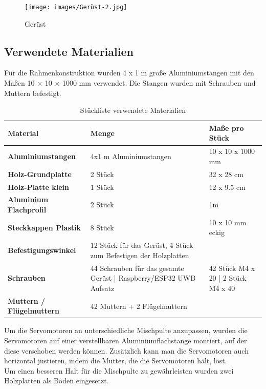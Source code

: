 \begin{figure}[H]
	\centering
	\texttt{[image: images/Gerüst-2.jpg]}
	\caption[Gerüst]{Gerüst}
	\label{fig:Gerüst-1}
\end{figure}


\newpage
\subsection{Verwendete Materialien}
Für die Rahmenkonstruktion wurden 4 x 1 m große Aluminiumstangen mit den Maßen 10 × 10 × 1000 mm verwendet. Die Stangen wurden mit Schrauben und Muttern befestigt.\\

\begin{table} [H]
	\begin{tabular}{ |p{3.3cm} |p{4.8cm}|p{4.8cm}| }
		\hline
		\textbf{Material} & \textbf{Menge}& \textbf{Maße pro Stück}\\
		\hline
		\textbf{Aluminiumstangen} & 4x1 m Aluminiumstangen & 10 x 10 x 1000 mm  \\ 
		\hline
		\textbf{Holz-Grundplatte} & 2 Stück & 32 x 28 cm   \\  
		\hline
		\textbf{Holz-Platte klein} & 1 Stück & 12 x 9.5 cm   \\  
		\hline
		\textbf{Aluminium Flachprofil} & 2 Stück  & 1m \\
		\hline
		\textbf{Steckkappen Plastik} & 8 Stück & 10 x 10 mm eckig  \\
		\hline
		\textbf{Befestigungswinkel}& 12 Stück für das Gerüst, 4 Stück zum Befestigen der Holzplatten   &  \\
		\hline
		\textbf{Schrauben}& 44 Schrauben für das gesamte Gerüst | 	Raspberry/ESP32 UWB Aufsatz & 42 Stück M4 x 20 | 2 Stück M4 x 40\\
		\hline
		\textbf{Muttern / Flügelmuttern}& 42 Muttern + 2 Flügelmuttern & \\
		\hline	
	\end{tabular}
	\caption{Stückliste verwendete Materialien} 
\end{table} 



\newpage
Um die Servomotoren an unterschiedliche Mischpulte anzupassen, wurden die Servomotoren auf einer verstellbaren Aluminiumflachstange montiert, auf der diese verschoben werden können. Zusätzlich kann man die Servomotoren auch horizontal justieren, indem die Mutter, die die Servomotoren hält, löst. \\
Um einen besseren Halt für die Mischpulte zu gewährleisten wurden zwei Holzplatten als Boden eingesetzt.

